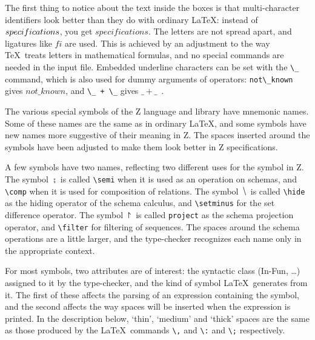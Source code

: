 \documentclass{article}
\begin{document}
The first thing to notice about the text inside the boxes is that
multi-character identifiers look better than they do with ordinary
\LaTeX: instead of $\mit specifications$, you get $specifications$.
The letters are not spread apart, and ligatures like $fi$ are used.
This is achieved by an adjustment to the way \TeX\ treats letters in
mathematical formulas, and no special commands are needed in the input
file. Embedded underline characters can be set with the \verb/\_/
command, which is also used for dummy arguments of operators:
\verb/not\_known/ gives $not\_known$, and \verb/\_ + \_/ gives 
$\_ + \_$~.

The various special symbols of the Z language and library have
mnemonic names. Some of these names are the same as in ordinary
\LaTeX, and some symbols have new names more suggestive of their
meaning in Z. The spaces inserted around the symbols have been
adjusted to make them look better in Z specifications.

A few symbols have two names, reflecting two different uses for the
symbol in Z. The symbol $\semi$ is called \verb/\semi/ when it is used
as an operation on schemas, and \verb/\comp/ when it is used for
composition of relations. The symbol $\hide$ is called \verb/\hide/ as
the hiding operator of the schema calculus, and \verb/\setminus/ for
the set difference operator. The symbol $\project$ is called
\verb/project/ as the schema projection operator, and \verb/\filter/
for filtering of sequences.  The spaces around the schema operations
are a little larger, and the type-checker recognizes each name only in
the appropriate context.

For most symbols, two attributes are of interest: the syntactic class
({\sf In-Fun}, \dots) assigned to it by the type-checker, and the kind
of symbol \LaTeX\ generates from it. The first of these affects the
parsing of an expression containing the symbol, and the second affects
the way spaces will be inserted when the expression is printed. In the
description below, `thin', `medium' and `thick' spaces are the same as
those produced by the \LaTeX\ commands \verb/\,/ and \verb/\:/ and
\verb/\;/ respectively.
\end{document}
